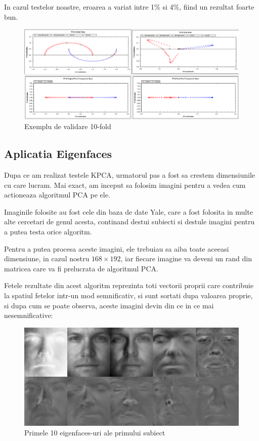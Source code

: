 \documentclass[12pt,oneside]{article}
\begin{document}
In cazul testelor noastre, eroarea a variat intre 1\% si 4\%, fiind un rezultat foarte bun.

\begin{figure}[H]
\centering
\caption{Exemplu de validare 10-fold}
\includegraphics[width=\linewidth]{tenfold1}
\end{figure}

\newpage

\subsection{Aplicatia Eigenfaces}
Dupa ce am realizat testele KPCA, urmatorul pas a fost sa crestem dimensiunile cu care lucram. Mai exact, am inceput sa folosim imagini pentru a vedea cum actioneaza algoritmul PCA pe ele.

Imaginile folosite au fost cele din baza de date Yale, care a fost folosita in multe alte cercetari de genul acesta, continand destui subiecti si destule imagini pentru a putea testa orice algoritm.\cite{yale_db}

Pentru a putea procesa aceste imagini, ele trebuiau sa aiba toate aceeasi dimensiune, in cazul nostru $168 \times 192$, iar fiecare imagine va deveni un rand din matricea care va fi prelucrata de algoritmul PCA.

Fetele rezultate din acest algoritm reprezinta toti vectorii proprii care contribuie la spatiul fetelor intr-un mod semnificativ, si sunt sortati dupa valoarea proprie, si dupa cum se poate observa, aceste imagini devin din ce in ce mai nesemnificative: 

\begin{figure}[H]
\centering
\caption{Primele 10 eigenfaces-uri ale primului subiect}
\includegraphics[width=\linewidth]{eigenfaces}
\end{figure}
\end{document}
